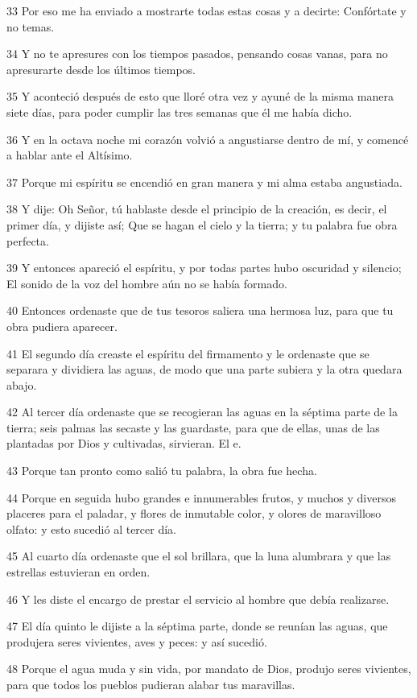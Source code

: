 \par 33 Por eso me ha enviado a mostrarte todas estas cosas y a decirte: Confórtate y no temas.
\par 34 Y no te apresures con los tiempos pasados, pensando cosas vanas, para no apresurarte desde los últimos tiempos.
\par 35 Y aconteció después de esto que lloré otra vez y ayuné de la misma manera siete días, para poder cumplir las tres semanas que él me había dicho.
\par 36 Y en la octava noche mi corazón volvió a angustiarse dentro de mí, y comencé a hablar ante el Altísimo.
\par 37 Porque mi espíritu se encendió en gran manera y mi alma estaba angustiada.
\par 38 Y dije: Oh Señor, tú hablaste desde el principio de la creación, es decir, el primer día, y dijiste así; Que se hagan el cielo y la tierra; y tu palabra fue obra perfecta.
\par 39 Y entonces apareció el espíritu, y por todas partes hubo oscuridad y silencio; El sonido de la voz del hombre aún no se había formado.
\par 40 Entonces ordenaste que de tus tesoros saliera una hermosa luz, para que tu obra pudiera aparecer.
\par 41 El segundo día creaste el espíritu del firmamento y le ordenaste que se separara y dividiera las aguas, de modo que una parte subiera y la otra quedara abajo.
\par 42 Al tercer día ordenaste que se recogieran las aguas en la séptima parte de la tierra; seis palmas las secaste y las guardaste, para que de ellas, unas de las plantadas por Dios y cultivadas, sirvieran. El e.
\par 43 Porque tan pronto como salió tu palabra, la obra fue hecha.
\par 44 Porque en seguida hubo grandes e innumerables frutos, y muchos y diversos placeres para el paladar, y flores de inmutable color, y olores de maravilloso olfato: y esto sucedió al tercer día.
\par 45 Al cuarto día ordenaste que el sol brillara, que la luna alumbrara y que las estrellas estuvieran en orden.
\par 46 Y les diste el encargo de prestar el servicio al hombre que debía realizarse.
\par 47 El día quinto le dijiste a la séptima parte, donde se reunían las aguas, que produjera seres vivientes, aves y peces: y así sucedió.
\par 48 Porque el agua muda y sin vida, por mandato de Dios, produjo seres vivientes, para que todos los pueblos pudieran alabar tus maravillas.
